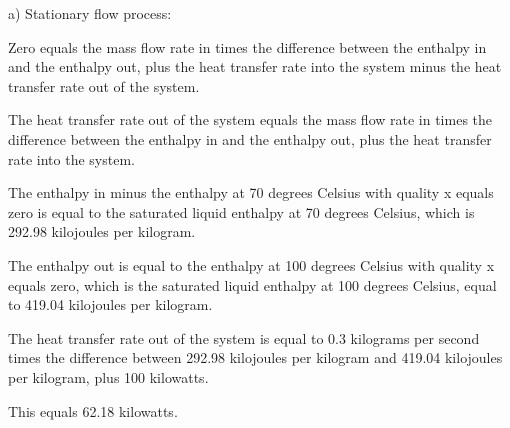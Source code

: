 a) Stationary flow process:

Zero equals the mass flow rate in times the difference between the enthalpy in and the enthalpy out, plus the heat transfer rate into the system minus the heat transfer rate out of the system.

The heat transfer rate out of the system equals the mass flow rate in times the difference between the enthalpy in and the enthalpy out, plus the heat transfer rate into the system.

The enthalpy in minus the enthalpy at 70 degrees Celsius with quality x equals zero is equal to the saturated liquid enthalpy at 70 degrees Celsius, which is 292.98 kilojoules per kilogram.

The enthalpy out is equal to the enthalpy at 100 degrees Celsius with quality x equals zero, which is the saturated liquid enthalpy at 100 degrees Celsius, equal to 419.04 kilojoules per kilogram.

The heat transfer rate out of the system is equal to 0.3 kilograms per second times the difference between 292.98 kilojoules per kilogram and 419.04 kilojoules per kilogram, plus 100 kilowatts.

This equals 62.18 kilowatts.